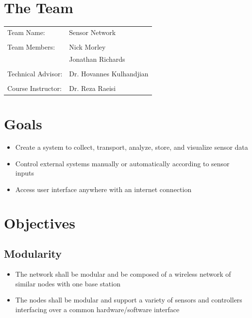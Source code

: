 


  	
	
	\renewcommand*\contentsname{
		\begin{align*}
			\normalsize \textbf{TABLE OF CONTENTS}
		\end{align*}
		\noindent\makebox[\textwidth]{\normalsize \textbf{Section}\hfill \normalsize  \textbf{Page}}
	}
	\tableofcontents
	
	\newpage
	
	\section{The Team}
		\vfill
		\begin{tabular}{l l}
			Team Name:    & Sensor Network    \\
			\\
			Team Members: & Nick Morley       \\
			              & Jonathan Richards \\
			              \\
			Technical Advisor: & Dr. Hovannes Kulhandjian\\
			\\
			Course Instructor: & Dr. Reza Raeisi\\
		\end{tabular}
		 
	\section{Goals}
		\begin{itemize}
			\item Create a system to collect, transport, analyze, store, and visualize sensor data
			\item Control external systems manually or automatically according to sensor inputs
			\item Access user interface anywhere with an internet connection
		\end{itemize}
		
	\section{Objectives}
		\subsection{Modularity}
			\begin{itemize}
				\item The network shall be modular and be composed of a wireless network of similar nodes with one base station
				\item The nodes shall be modular and support a variety of sensors and controllers interfacing over a common hardware/software interface
			\end{itemize}
			
